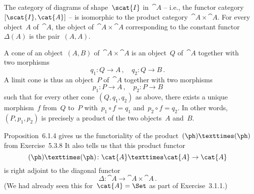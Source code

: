 \subsection{}

The category of diagrams of shape~$\scat{I}$ in~$\cat{A}$ -- i.e., the functor category~$[\scat{I}, \cat{A}]$ -- is isomorphic to the product category~$\cat{A} × \cat{A}$.
For every object~$A$ of~$\cat{A}$, the object of~$\cat{A} × \cat{A}$ corresponding to the constant functor~$Δ(A)$ is the pair~$(A, A)$.

A cone of an object~$(A, B)$ of~$\cat{A} × \cat{A}$ is an object~$Q$ of~$\cat{A}$ together with two morphisms
\[
	q_1 \colon Q \to A \,,
	\quad
	q_2 \colon Q \to B \,.
\]
A limit cone is thus an object~$P$ of~$\cat{A}$ together with two morphisms
\[
	p_1 \colon P \to A \,,
	\quad
	p_2 \colon P \to B
\]
such that for every other cone~$(Q, q_1, q_2)$ as above, there exists a unique morphism~$f$ from~$Q$ to~$P$ with~$p_1 ∘ f = q_1$ and~$p_2 ∘ f = q_2$.
In other words,~$(P, p_1, p_2)$ is precisely a product of the two objects~$A$ and~$B$.

Proposition~6.1.4 gives us the functoriality of the product~$(\ph) × (\ph)$ from Exercise~5.3.8
It also tells us that this product functor
\[
	(\ph) × (\ph) \colon \cat{A} × \cat{A} \to \cat{A}
\]
is right adjoint to the diagonal functor
\[
	Δ \colon \cat{A} \to \cat{A} × \cat{A} \,.
\]
(We had already seen this for~$\cat{A} = \Set$ as part of Exercise~3.1.1.)
